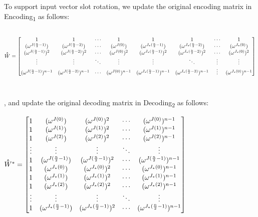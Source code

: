 \begin{tcolorbox}[title={\textbf{\tboxlabel{\ref*{subsec:bfv-rotation}} BFV's Homomorphic Rotation of Input Vector Slots}}]

To support input vector slot rotation, we update the original encoding matrix in \textsf{Encoding\textsubscript{1}} as follows: 

$ $

{\footnotesize{\noindent $\hathat W = \begin{bmatrix}
1 & 1 & \cdots & 1 & 1 & 1 & \cdots & 1\\
(\omega^{J(\frac{n}{2} - 1)}) & (\omega^{J(\frac{n}{2} - 2)}) & \cdots & (\omega^{J(0)}) & (\omega^{J_*(\frac{n}{2} - 1)}) & (\omega^{J_*(\frac{n}{2} - 2)}) & \cdots & (\omega^{J_*(0)})\\
(\omega^{J(\frac{n}{2} - 1)})^2 & (\omega^{J(\frac{n}{2} - 2)})^2 & \cdots & (\omega^{J(0)})^2 & (\omega^{J_*(\frac{n}{2} - 1)})^2 & (\omega^{J_*(\frac{n}{2} - 2)})^2 & \cdots & (\omega^{J_*(0)})^2 \\
\vdots & \vdots & \ddots & \vdots & \vdots & \ddots & \vdots & \vdots \\
(\omega^{J(\frac{n}{2} - 1)})^{n-1} & (\omega^{J(\frac{n}{2} - 2)})^{n-1} & \cdots & (\omega^{J(0)})^{n-1} & (\omega^{J_*(\frac{n}{2} - 1)})^{n-1} & (\omega^{J_*(\frac{n}{2} - 2)})^{n-1} & \vdots  & (\omega^{J_*(0)})^{n-1}
\end{bmatrix}$}}

$ $

$ $


, and update the original decoding matrix in \textsf{Decoding\textsubscript{2}} as follows:

$\hathat{W}^* = \begin{bmatrix}
1 & (\omega^{J(0)}) & (\omega^{J(0)})^2 & \cdots & (\omega^{J(0)})^{n-1}\\
1 & (\omega^{J(1)}) & (\omega^{J(1)})^2 & \cdots & (\omega^{J(1)})^{n-1}\\
1 & (\omega^{J(2)}) & (\omega^{J(2)})^2 & \cdots & (\omega^{J(2)})^{n-1}\\
\vdots & \vdots & \vdots & \ddots & \vdots \\
1 & (\omega^{J(\frac{n}{2}-1)}) & (\omega^{J(\frac{n}{2}-1)})^2 & \cdots & (\omega^{J(\frac{n}{2}-1)})^{n-1}\\
1 & (\omega^{J_*(0)}) & (\omega^{J_*(0)})^2 & \cdots & (\omega^{J_*(0)})^{n-1}\\
1 & (\omega^{J_*(1)}) & (\omega^{J_*(1)})^2 & \cdots & (\omega^{J_*(1)})^{n-1}\\
1 & (\omega^{J_*(2)}) & (\omega^{J_*(2)})^2 & \cdots & (\omega^{J_*(2)})^{n-1}\\
\vdots & \vdots & \vdots & \ddots & \vdots \\
1 & (\omega^{J_*(\frac{n}{2}-1)}) & (\omega^{J_*(\frac{n}{2}-1)})^2 & \cdots & (\omega^{J_*(\frac{n}{2}-1)})^{n-1}\\
\end{bmatrix}$


\end{tcolorbox}
